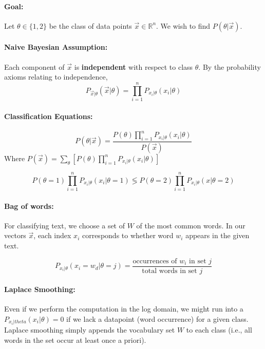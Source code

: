 \documentclass[a4paper,12pt]{report}
\begin{document}
\paragraph{Goal: } Let $\theta\in \{1,2\}$ be the class of data points $\vec x \in \mathbb R^n$. We wish to find $P(\theta | \vec x)$.

\paragraph{Naive Bayesian Assumption: } Each component of $\vec x$ is \textbf{independent} with respect to class $\theta$. By the probability axioms relating to independence, 
\begin{equation}
P_{\vec x | \theta}(\vec x | \theta) = \prod_{i = 1}^n P_{x_i | \theta}(x_i | \theta)
\end{equation}


\paragraph{Classification Equations: } 
\begin{equation}
P(\theta | \vec x) = \frac{P(\theta) \prod_{i=1}^n P_{x_i | \theta}(x_i | \theta) }{P(\vec x)} 
\end{equation}
Where $P(\vec x) = \sum_{\theta}^{} [P(\theta) \prod_{i=1}^n P_{x_i|\theta} (x_i | \theta)]$

\begin{equation}
P(\theta = 1) \prod_{i=1}^n P_{x_i | \theta}(x_i | \theta = 1) \lessgtr P(\theta = 2) \prod_{i=1}^n P_{x_i | \theta}(x | \theta = 2)
\end{equation}


\paragraph{Bag of words: } For classifying text, we choose a set of $W$ of the most common words. In our vectors $\vec x$, each index $x_i$ corresponds to whether word $w_i$ appears in the given text. 

\begin{equation}
P_{x_i | \theta}(x_i = w_d | \theta = j) = \frac{\text{occurrences of } w_i \text{ in set }j}{\text{total words in set }j} 
\end{equation}


\paragraph{Laplace Smoothing: } Even if we perform the computation in the log domain, we might run into a $P_{x_i|theta}(x_i | \theta) = 0$ if we lack a datapoint (word occurrence) for a given class. Laplace smoothing simply appends the vocabulary set $W$ to each class (i.e., all words in the set occur at least once a priori).
\end{document}

